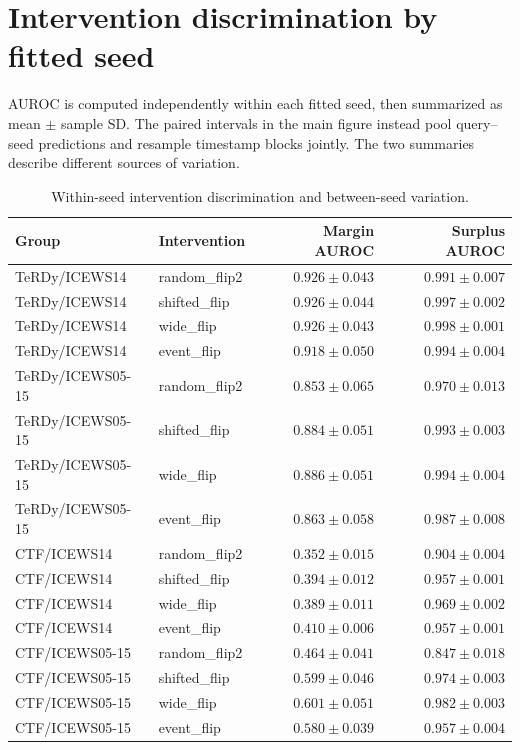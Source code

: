 \section{Intervention discrimination by fitted seed}
AUROC is computed independently within each fitted seed, then summarized as mean $\pm$ sample SD. The paired intervals in the main figure instead pool query--seed predictions and resample timestamp blocks jointly. The two summaries describe different sources of variation.
\small\begin{longtable}{llrr}\caption{Within-seed intervention discrimination and between-seed variation.}\\\toprule Group & Intervention & Margin AUROC & Surplus AUROC\\\midrule\endhead
TeRDy/ICEWS14 & random\_flip2 & $0.926\pm0.043$ & $0.991\pm0.007$\\
TeRDy/ICEWS14 & shifted\_flip & $0.926\pm0.044$ & $0.997\pm0.002$\\
TeRDy/ICEWS14 & wide\_flip & $0.926\pm0.043$ & $0.998\pm0.001$\\
TeRDy/ICEWS14 & event\_flip & $0.918\pm0.050$ & $0.994\pm0.004$\\
TeRDy/ICEWS05-15 & random\_flip2 & $0.853\pm0.065$ & $0.970\pm0.013$\\
TeRDy/ICEWS05-15 & shifted\_flip & $0.884\pm0.051$ & $0.993\pm0.003$\\
TeRDy/ICEWS05-15 & wide\_flip & $0.886\pm0.051$ & $0.994\pm0.004$\\
TeRDy/ICEWS05-15 & event\_flip & $0.863\pm0.058$ & $0.987\pm0.008$\\
CTF/ICEWS14 & random\_flip2 & $0.352\pm0.015$ & $0.904\pm0.004$\\
CTF/ICEWS14 & shifted\_flip & $0.394\pm0.012$ & $0.957\pm0.001$\\
CTF/ICEWS14 & wide\_flip & $0.389\pm0.011$ & $0.969\pm0.002$\\
CTF/ICEWS14 & event\_flip & $0.410\pm0.006$ & $0.957\pm0.001$\\
CTF/ICEWS05-15 & random\_flip2 & $0.464\pm0.041$ & $0.847\pm0.018$\\
CTF/ICEWS05-15 & shifted\_flip & $0.599\pm0.046$ & $0.974\pm0.003$\\
CTF/ICEWS05-15 & wide\_flip & $0.601\pm0.051$ & $0.982\pm0.003$\\
CTF/ICEWS05-15 & event\_flip & $0.580\pm0.039$ & $0.957\pm0.004$\\
\bottomrule\end{longtable}\normalsize